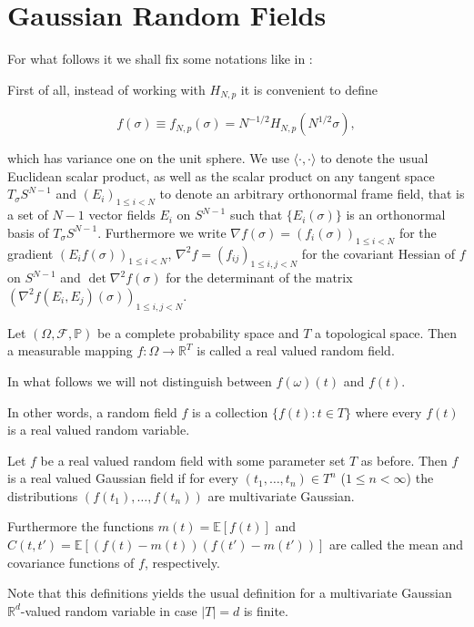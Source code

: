 \section{Gaussian Random Fields}\label{sec:GRF}
For what follows it we shall fix some notations like in \cite{Cerny10}:

First of all, instead of working with $H_{N,p}$ it is convenient to define

\begin{equation}\label{def:rescaledHamiltonian}
	f(\sigma)\equiv f_{N,p}(\sigma)=N^{-1/2}H_{N,p}(N^{1/2}\sigma),
\end{equation}


which has variance one on the unit sphere. We use $\langle\cdot,\cdot\rangle$ to denote the usual Euclidean scalar product, as well as the scalar product on any tangent space $T_\sigma S^{N-1}$ and $(E_i)_{1\leq i<N}$ to denote an arbitrary orthonormal frame field, that is a set of $N-1$ vector fields $E_i$ on $S^{N-1}$ such that $\{E_i(\sigma)\}$ is an orthonormal basis of $T_\sigma S^{N-1}$. Furthermore we write $\nabla f(\sigma)=(f_i(\sigma))_{1\leq i<N}$ for the gradient $(E_i f(\sigma))_{1\leq i<N}$, $\nabla^2 f = (f_{ij})_{1\leq i,j<N}$ for the covariant Hessian of $f$ on $S^{N-1}$ and $\det\nabla^2 f(\sigma)$ for the determinant of the matrix $(\nabla^2 f(E_i,E_j)(\sigma))_{1\leq i,j<N}$.

\begin{definition}
	Let $(\Omega,\mathcal F, \mathbb P)$ be a complete probability space and $T$ a topological space. Then a measurable mapping $f:\Omega\rightarrow\mathbb R^T$ is called a real valued random field.
	
	In what follows we will not distinguish between $f(\omega)(t)$ and $f(t)$.
\end{definition}
In other words, a random field $f$ is a collection $\{f(t):t\in T\}$ where every $f(t)$ is a real valued random variable.

\begin{definition}
	Let $f$ be a real valued random field with some parameter set $T$ as before. Then $f$ is a real valued Gaussian field if for every $(t_1,\dots,t_n)\in T^n$ ($1\leq n <\infty$) the distributions $(f(t_1),\dots,f(t_n))$ are multivariate Gaussian.
	
	Furthermore the functions $m(t)=\mathbb E[f(t)]$ and $C(t,t')=\mathbb E[(f(t)-m(t))(f(t')-m(t'))]$ are called the mean and covariance functions of $f$, respectively.
\end{definition}
Note that this definitions yields the usual definition for a multivariate Gaussian $\mathbb R^d$-valued random variable in case $|T|=d$ is finite.

